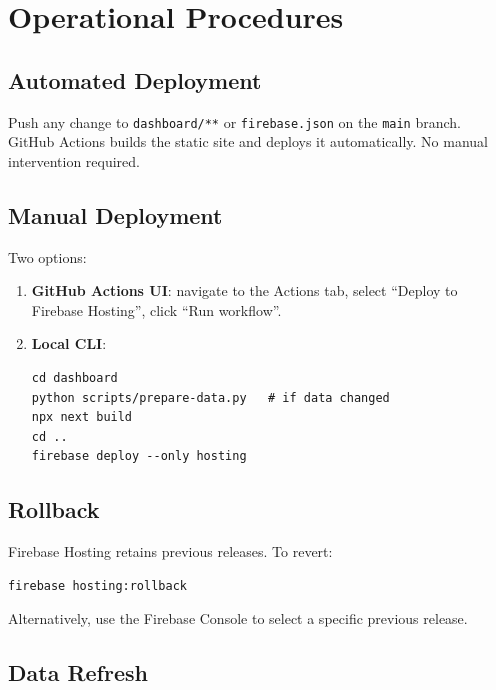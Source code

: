 \documentclass[11pt,a4paper]{article}
\theoremstyle{plainref}
\begin{document}
\section{Operational Procedures}

\subsection{Automated Deployment}

Push any change to \texttt{dashboard/**} or \texttt{firebase.json} on the
\texttt{main} branch. GitHub Actions builds the static site and deploys it
automatically. No manual intervention required.

\subsection{Manual Deployment}

Two options:

\begin{enumerate}[label=(\alph*)]
  \item \textbf{GitHub Actions UI}: navigate to the Actions tab, select
        ``Deploy to Firebase Hosting'', click ``Run workflow''.
  \item \textbf{Local CLI}:
\begin{verbatim}
cd dashboard
python scripts/prepare-data.py   # if data changed
npx next build
cd ..
firebase deploy --only hosting
\end{verbatim}
\end{enumerate}

\subsection{Rollback}

Firebase Hosting retains previous releases. To revert:

\begin{verbatim}
firebase hosting:rollback
\end{verbatim}

Alternatively, use the Firebase Console to select a specific previous release.

\subsection{Data Refresh}
\end{document}
